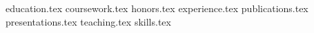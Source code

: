 \documentclass[12pt, a4paper]{awesome-cv}
\newcommand*{\sectiondir}{cv/}
\begin{document}
\makecvheader


{education.tex}
\vspace*{-15pt}
{coursework.tex}
{honors.tex}
{experience.tex}
{publications.tex}
{presentations.tex}
{teaching.tex}
{skills.tex}


\end{document}
